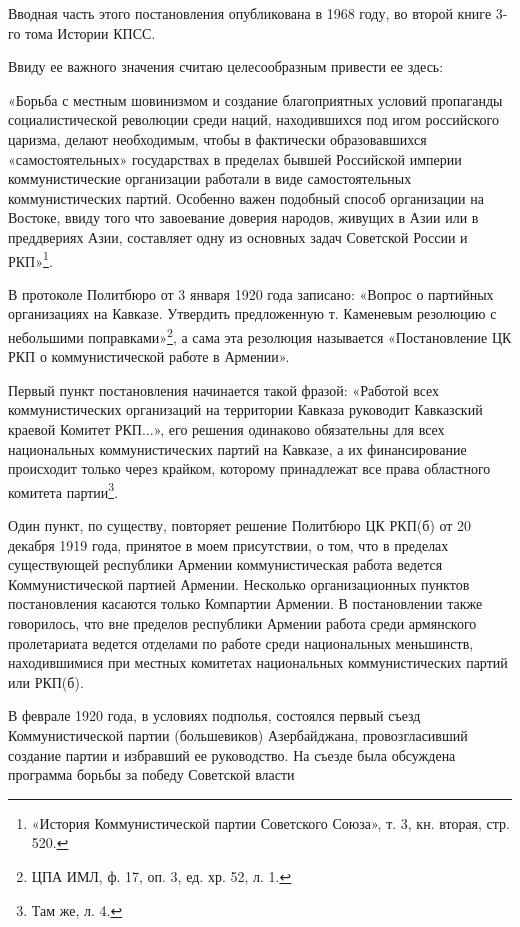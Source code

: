 \documentclass[12pt, a4paper, openany]{book}
\begin{document}
Вводная часть этого постановления опубликована в 1968 году, во второй книге 3-го тома Истории КПСС.

Ввиду ее важного значения считаю целесообразным привести ее здесь:

«Борьба с местным шовинизмом и создание благоприятных условий пропаганды социалистической революции среди наций, находившихся под игом российского царизма, делают необходимым, чтобы в фактически образовавшихся «самостоятельных» государствах в пределах бывшей Российской империи коммунистические организации работали в виде самостоятельных коммунистических партий. Особенно важен подобный способ организации на Востоке, ввиду того что завоевание доверия народов, живущих в Азии или в преддвериях Азии, составляет одну из основных задач Советской России и РКП»\footnote{«История Коммунистической партии Советского Союза», т. 3, кн. вторая, стр. 520.}.

В протоколе Политбюро от 3 января 1920 года записано: «Вопрос о партийных организациях на Кавказе. Утвердить предложенную т. Каменевым резолюцию с небольшими поправками»\footnote{ЦПА ИМЛ, ф. 17, оп. 3, ед. хр. 52, л. 1.}, а сама эта резолюция называется «Постановление ЦК РКП о коммунистической работе в Армении».

Первый пункт постановления начинается такой фразой: «Работой всех коммунистических организаций на территории Кавказа руководит Кавказский краевой Комитет РКП...», его решения одинаково обязательны для всех национальных коммунистических партий на Кавказе, а их финансирование происходит только через крайком, которому принадлежат все права областного комитета партии\footnote{Там же, л. 4.}.

Один пункт, по существу, повторяет решение Политбюро ЦК РКП(б) от 20 декабря 1919 года, принятое в моем присутствии, о том, что в пределах существующей республики Армении коммунистическая работа ведется Коммунистической партией Армении. Несколько организационных пунктов постановления касаются только Компартии Армении. В постановлении также говорилось, что вне пределов республики Армении работа среди армянского пролетариата ведется отделами по работе среди национальных меньшинств, находившимися при местных комитетах национальных коммунистических партий или РКП(б).

В феврале 1920 года, в условиях подполья, состоялся первый съезд Коммунистической партии (большевиков) Азербайджана, провозгласивший создание партии и избравший ее руководство. На съезде была обсуждена программа борьбы за победу Советской власти
\end{document}
